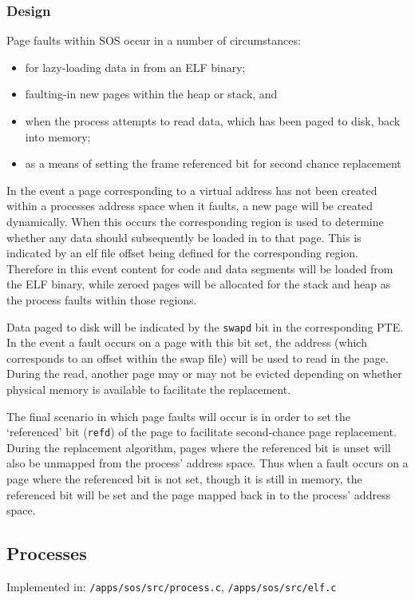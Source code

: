 \documentclass[a4paper,12pt]{article}
\begin{document}
\subsubsection{Design}
Page faults within SOS occur in a number of circumstances:

\begin{itemize}
\item for lazy-loading data in from an ELF binary;
\item faulting-in new pages within the heap or stack, and
\item when the process attempts to read data, which has been paged to disk, back into memory;
\item as a means of setting the frame referenced bit for second chance replacement
\end{itemize}

In the event a page corresponding to a virtual address has not been created
within a processes address space when it faults, a new page will be created
dynamically.  When this occurs the corresponding region is used to determine
whether any data should subsequently be loaded in to that page.  This is
indicated by an elf file offset being defined for the corresponding region.
Therefore in this event content for code and data segments will be loaded from
the ELF binary, while zeroed pages will be allocated for the stack and heap as
the process faults within those regions.

Data paged to disk will be indicated by the \texttt{swapd} bit in the corresponding
PTE.  In the event a fault occurs on a page with this bit set, the address
(which corresponds to an offset within the swap file) will be used to read in
the page.  During the read, another page may or may not be evicted depending
on whether physical memory is available to facilitate the replacement.

The final scenario in which page faults will occur is in order to set the
`referenced' bit (\texttt{refd}) of the page to facilitate second-chance page
replacement.  During the replacement algorithm, pages where the referenced bit
is unset will also be unmapped from the process' address space.  Thus when a
fault occurs on a page where the referenced bit is not set, though it is still
in memory, the referenced bit will be set and the page mapped back in to the
process' address space.

\subsection{Processes}
Implemented in: \texttt{/apps/sos/src/process.c}, \texttt{/apps/sos/src/elf.c}
\end{document}
